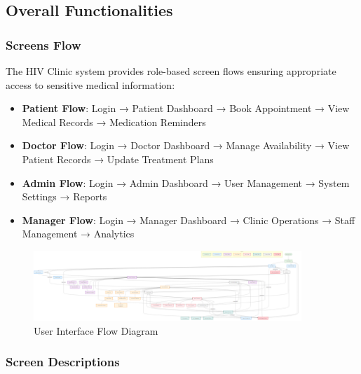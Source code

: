 \documentclass[12pt,a4paper]{article}
\begin{document}
\subsection{Overall Functionalities}

\subsubsection{Screens Flow}

The HIV Clinic system provides role-based screen flows ensuring appropriate access to sensitive medical information:

\begin{itemize}
    \item \textbf{Patient Flow}: Login → Patient Dashboard → Book Appointment → View Medical Records → Medication Reminders
    \item \textbf{Doctor Flow}: Login → Doctor Dashboard → Manage Availability → View Patient Records → Update Treatment Plans
    \item \textbf{Admin Flow}: Login → Admin Dashboard → User Management → System Settings → Reports
    \item \textbf{Manager Flow}: Login → Manager Dashboard → Clinic Operations → Staff Management → Analytics
\end{itemize}

\begin{figure}
\centering
\includegraphics[width=0.9\textwidth]{diagrams/user_interface_flow.png}
\caption{User Interface Flow Diagram}
\label{fig:ui-flow-diagram}
\end{figure}

\subsubsection{Screen Descriptions}
\end{document}
